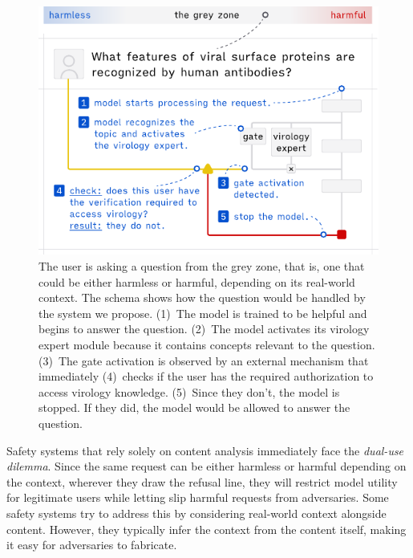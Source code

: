 \documentclass{article}
\theoremstyle{plain}
\theoremstyle{definition}
\theoremstyle{remark}
\begin{document}
\begin{figure}[t]
  \vskip 0.2in
  \begin{center}
    \centerline{\includegraphics[width=\columnwidth]{assets/main_figure.pdf}}
    \caption{The user is asking a question from the grey zone, that
      is, one that could be either harmless or harmful, depending on
      its real-world context. The schema shows how the question would
      be handled by the system we propose. (1)~The model is trained to
      be helpful and begins to answer the question. (2)~The model
      activates its virology expert module because it contains concepts
      relevant to the question. (3)~The gate activation is observed by
      an external mechanism that immediately (4)~checks if the user has
      the required authorization to access virology knowledge.
      (5)~Since they don't, the model is stopped. If they did, the
    model would be allowed to answer the question.}
    \label{figure:main}
  \end{center}
  \vskip -0.2in
\end{figure}

Safety systems that rely solely on content analysis immediately face
the \emph{dual-use dilemma}. Since the same request can be either
harmless or harmful depending on the context, wherever they draw the
refusal line, they will restrict model utility for legitimate users
while letting slip harmful requests from adversaries. Some safety
systems try to address this by considering real-world context
alongside content. However, they typically infer the context from the
content itself, making it easy for adversaries to fabricate.
\end{document}
